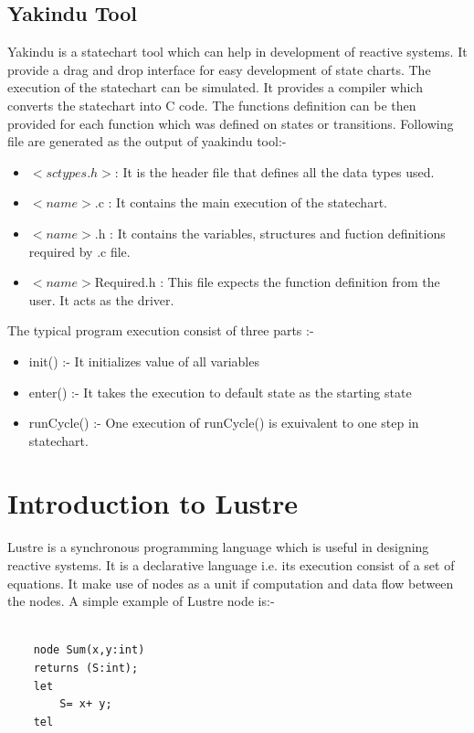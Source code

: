 \documentclass[16pt]{report}
\begin{document}
\subsection{Yakindu Tool}
Yakindu is a statechart tool which can help in development of reactive systems. It provide a drag and drop interface for easy development of state charts. The execution of the statechart can be simulated. It provides a compiler which converts the statechart into C code. The functions definition can be then provided for each function which was defined on states or transitions. Following file are generated as the output of yaakindu tool:-
\begin{itemize}
    \item $<sc types.h>$: It is the header file that defines all the data types used.
    \item $<name>$.c : It contains the main execution of the statechart.
    \item $<name>$.h : It contains the variables, structures and fuction definitions required by .c file.
    \item $<name>$Required.h : This file expects the function definition from the user. It acts as the driver.
\end{itemize}{}

The typical program execution consist of three parts :-
\begin{itemize}
    \item init() :- It initializes value of all variables
    \item enter() :- It takes the execution to default state as the starting state
    \item runCycle() :- One execution of runCycle() is exuivalent to one step in statechart.
\end{itemize}{}


\newpage

\section{Introduction to Lustre}
Lustre is a synchronous programming language which is useful in designing reactive systems. It is a declarative language i.e. its execution consist of a set of equations. It make use of nodes as a unit if computation and data flow between the nodes. A simple example of Lustre node is:-

\begin{verbatim}

    node Sum(x,y:int)
    returns (S:int);
    let
        S= x+ y;
    tel
\end{verbatim}{}
\end{document}
